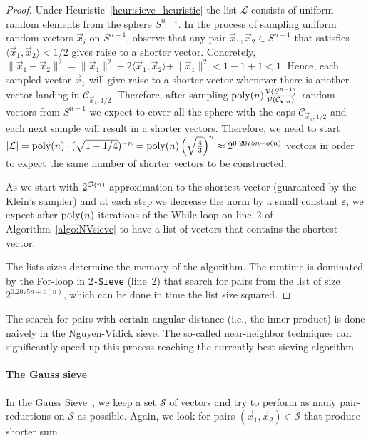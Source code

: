 \begin{proof}
	Under Heuristic~\ref{heur:sieve_heuristic} the list $\mathcal{L}$ consists of uniform random elements from the sphere $S^{n-1}$. In the process of sampling uniform random vectors $\vec x_i$ on $S^{n-1}$, observe that any pair $\vec x_1, \vec x_2 \in S^{n-1}$ that satisfies $\langle \vec x_1, \vec x_2 \rangle <1/2$ gives raise to a shorter vector. Concretely, $\| \vec x_1 - \vec x_2 \|^2 = \| \vec x_1 \|^2 -2\langle \vec x_1, \vec x_2 \rangle +\| \vec x_1 \|^2 < 1 - 1 + 1 < 1$. Hence, each sampled vector $\vec x_1$ will give raise to a shorter vector whenever there is another vector landing in $\mathcal{C}_{\vec x_1, 1/2}$. Therefore, after sampling $\operatorname{poly}(n) \frac {\mathcal{V}(S^{n-1})} {\mathcal{V} (	\mathcal{C}_{\mathbf v, \alpha} ) }$ random vectors from $S^{n-1}$ we expect to cover all the sphere with the caps $\mathcal{C}_{\vec x_1, 1/2}$ and each next sample will result in a shorter vectors. Therefore, we need to start $| \mathcal{L}| = \operatorname{poly}(n) \cdot(\sqrt{1-1/4})^{-n} = \operatorname{poly}(n) \left(\sqrt{\frac{4}{3}}\right)^{n}\approx 2^{0.2075n + o(n)}$ vectors in order to expect the same number of shorter vectors to be constructed.
	
	As we start with $2^{\mathcal{O}(n)}$ approximation to the shortest vector (guaranteed by the Klein's sampler) and at each step we decrease the norm by a small constant $\varepsilon$, we expect after $\operatorname{poly}(n)$ iterations of the While-loop on line~2 of Algorithm~\ref{algo:NVsieve} to have a list of vectors that contains the shortest vector.
	
	The lists sizes determine the memory of the algorithm. The runtime is dominated by the For-loop in 	\texttt{$2$-Sieve} (line~2) that search for pairs from the list of size $2^{0.2075n + o(n)}$, which can be done in time the list size squared.
	
\end{proof}

The search for pairs with certain angular distance (i.e., the inner product) is done naively in the Nguyen-Vidick sieve. The so-called near-neighbor techniques can significantly speed up this process reaching the currently best sieving algorithm~\cite{BDGL16}

\paragraph{The Gauss sieve}
 
In the Gauss Sieve~\cite{MV10}, we keep a set $\mathcal{S}$ of vectors and try to perform as many pair-reductions on $\mathcal{S}$ as possible. Again, we look for pairs $(\vec x_1, \vec x_2)\in \mathcal{S}$ that produce shorter sum.

